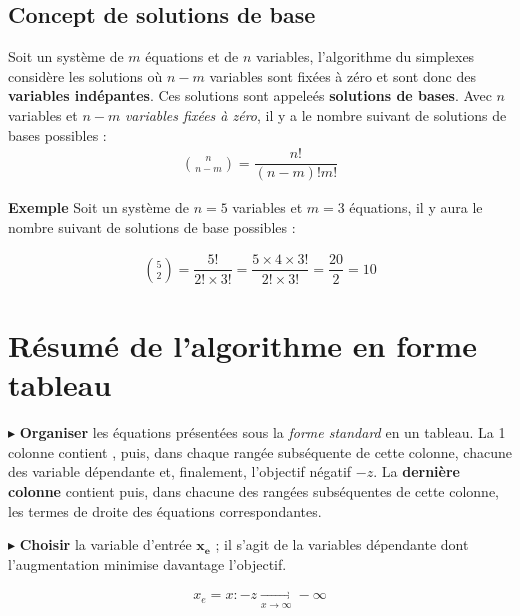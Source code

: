 \documentclass{report}
\begin{document}
\begin{multicols*}{2}
    \section{Concept de solutions de base}
    Soit un système de $m$ équations et de $n$ variables, l'algorithme 
    du simplexes considère les solutions où $n - m$ variables sont 
    fixées à zéro 
    et sont donc des \textbf{variables indépantes}. 
    Ces solutions sont appeleés 
    \textbf{solutions de bases}. 
    Avec $n$ variables et $n - m$ \textit{variables fixées à zéro}, il y a  
    le nombre suivant de solutions de bases possibles :
    \begin{align*}
        \boxed{{n \choose n - m} = \dfrac{n!}{(n - m )! m!}}
    \end{align*}

    
    \noindent
    \textbf{Exemple} 
    Soit un système de $n = 5$ variables et $m = 3$ équations, 
    il y aura le nombre suivant de solutions de base possibles :
     
    \begin{align*}
            {5 \choose 2} = \dfrac{5!}{2! \times 3!} = \dfrac{5 \times 4 \times 3!}{2! \times 3!} = \dfrac{20}{2} = 10 
    \end{align*}
\end{multicols*} 



\section{Résumé de l'algorithme en forme tableau}

\noindent 
    $\blacktriangleright$  \textbf{Organiser} les équations présentées sous 
    la \textit{forme standard} en un tableau. La 1 colonne 
    contient , puis, dans chaque rangée subséquente 
    de cette colonne, chacune des variable dépendante et, finalement, 
    l'objectif négatif $-z$. La \textbf{dernière colonne} contient 
     puis, dans chacune des rangées subséquentes de cette 
    colonne, les termes de droite des équations correspondantes. 


    \noindent 
    $\blacktriangleright$
    \textbf{Choisir} la variable d'entrée $\boldsymbol{x_e}$
    ; il s'agit de la variables
    dépendante dont l'augmentation minimise davantage l'objectif. 

    \begin{align*}
        \boxed{
        x_e = x : -z \underset{x \to \infty}{\longrightarrow} -\infty
        }
    \end{align*}                    
\end{document}
